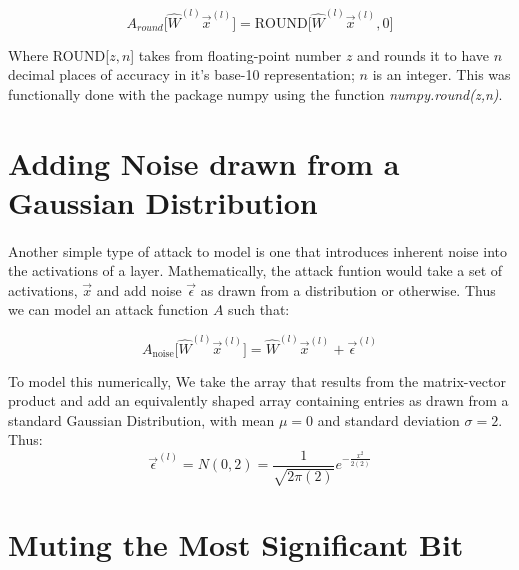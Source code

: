 \documentclass[12pt,letterpaper]{article}
\begin{document}
\begin{equation}
\label{round attack}
A_{round} \big[ \hat{W}^{(l)} \vec{x}^{(l)} \big] = \text{ROUND} \big[ \hat{W}^{(l)} \vec{x}^{(l)} ,0 \big]
\end{equation}

Where ROUND[$z,n$] takes from floating-point number $z$ and rounds it to have $n$ decimal places of accuracy in it's base-10 representation; $n$ is an integer. This was functionally done with the package numpy using the function \textit{numpy.round(z,n)}.


\section*{Adding Noise drawn from a Gaussian Distribution}

\paragraph*{}Another simple type of attack to model is one that introduces inherent noise into the activations of a layer. Mathematically, the attack funtion would take a set of activations, $\vec{x}$ and add noise $\vec{\epsilon}$ as drawn from a distribution or otherwise. Thus we can model an attack function $A$ such that:

\begin{equation}
\label{noise attack}
A_{\text{noise}} \big[ \hat{W}^{(l)} \vec{x}^{(l)} \big] = \hat{W}^{(l)} \vec{x}^{(l)} + \vec{\epsilon}^{(l)}
\end{equation}

To model this numerically, We take the array that results from the matrix-vector product and add an equivalently shaped array containing entries as drawn from a standard Gaussian Distribution, with mean $\mu = 0$ and standard deviation $\sigma = 2$. Thus:
\begin{equation}
\vec{\epsilon}^{(l)} = N(0,2) = \frac{1}{\sqrt{2\pi(2)}} e^{-\frac{x^2}{2(2)}}
\end{equation}



\section*{Muting the Most Significant Bit}
\end{document}
